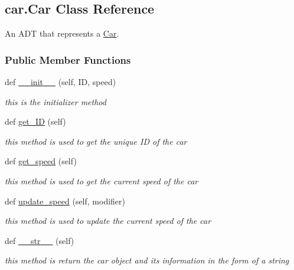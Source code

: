 \hypertarget{classcar_1_1_car}{}\subsection{car.\+Car Class Reference}
\label{classcar_1_1_car}


An A\+DT that represents a \mbox{\hyperlink{classcar_1_1_car}{Car}}.  


\subsubsection*{Public Member Functions}
\begin{DoxyCompactItemize}
\item 
\mbox{\label{classcar_1_1_car_aa1cf0a2ad3abe8b85039d9519b1d49df}} 
def \mbox{\hyperlink{classcar_1_1_car_aa1cf0a2ad3abe8b85039d9519b1d49df}{\+\_\+\+\_\+init\+\_\+\+\_\+}} (self, ID, speed)
\begin{DoxyCompactList}\small\item\em this is the initializer method \end{DoxyCompactList}\item 
def \mbox{\hyperlink{classcar_1_1_car_a990e5ebf23e690cf3b2de63e3a2525e1}{get\+\_\+\+ID}} (self)
\begin{DoxyCompactList}\small\item\em this method is used to get the unique ID of the car \end{DoxyCompactList}\item 
def \mbox{\hyperlink{classcar_1_1_car_ad13e6767359488bf7df29e200d3b08c9}{get\+\_\+speed}} (self)
\begin{DoxyCompactList}\small\item\em this method is used to get the current speed of the car \end{DoxyCompactList}\item 
def \mbox{\hyperlink{classcar_1_1_car_a563092c468b011341076c35d3630a0ef}{update\+\_\+speed}} (self, modifier)
\begin{DoxyCompactList}\small\item\em this method is used to update the current speed of the car \end{DoxyCompactList}\item 
def \mbox{\hyperlink{classcar_1_1_car_a17a9b468d12c574f015ff0c7a3412aab}{\+\_\+\+\_\+str\+\_\+\+\_\+}} (self)
\begin{DoxyCompactList}\small\item\em this method is return the car object and it\textquotesingle{}s information in the form of a string \end{DoxyCompactList}\end{DoxyCompactItemize}
